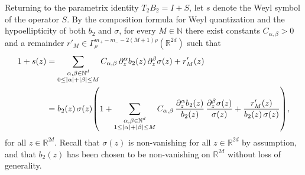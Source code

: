 \documentclass[a4paper,12pt]{article}
\let\originalleft\left
\let\originalright\right
\renewcommand{\left}{\mathopen{}\mathclose\bgroup\originalleft}
\renewcommand{\right}{\aftergroup\egroup\originalright}
\newcommand{\N}{\mathbb{N}}
\newcommand{\R}{\mathbb{R}}
\begin{document}
Returning to the parametrix identity \(T_2 B_2 = I + S\), let \(s\) denote the Weyl
symbol of the %
operator \(S\).
By the composition formula for Weyl quantization
\cite[Theorem~23.6]{shubin_pseudodifferential_2001} and the hypoellipticity of both
\(b_2\) and \(\sigma\), for every \(M\in\N\) there exist constants
\(C_{\alpha,\beta}>0\) and a remainder
\(r'_M\in\Gamma^{m_+ - m_- - 2(M+1)\rho}_{\rho}(\R^{2d})\) such that
\begin{align}
    1+s(z)
    &=
    \sum_{\substack{\alpha,\beta\in\N^d\\0\le|\alpha|+|\beta|\le M}}
    C_{\alpha,\beta}\,
    \partial_z^\alpha b_2(z)\,
    \partial_z^\beta \sigma(z)
    + r'_M(z)
    \label{eq:long-formula-1}\\
    &=
    b_2(z)\,\sigma(z)
    \left(
        1
        + \sum_{\substack{\alpha,\beta\in\N^d\\1\le|\alpha|+|\beta|\le M}}
        C_{\alpha,\beta}\,
        \frac{\partial_z^\alpha b_2(z)}{b_2(z)}\,
        \frac{\partial_z^\beta \sigma(z)}{\sigma(z)}
        + \frac{r'_M(z)}{b_2(z)\,\sigma(z)}
    \right),
    \label{eq:long-formula-2}
\end{align}
for all \(z\in\R^{2d}\). 
Recall that $\sigma(z)$ is non-vanishing for all $z\in\R^{2d}$ by assumption, 
and that $b_2(z)$ has been chosen to be non-vanishing on $\R^{2d}$ without loss of generality.
\end{document}
